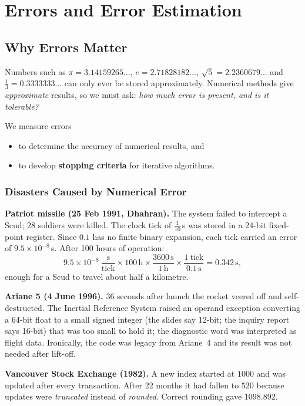\documentclass[hidelinks]{article}
\begin{document}
\section{Errors and Error Estimation}

\subsection{Why Errors Matter}

Numbers such as $\pi=3.14159265\ldots$, $e=2.71828182\ldots$, $\sqrt5=2.2360679\ldots$ and $\tfrac13=0.3333333\ldots$ can only ever be stored approximately. Numerical methods give \emph{approximate} results, so we must ask: \emph{how much error is present, and is it tolerable?}

We measure errors
\begin{itemize}
    \item to determine the accuracy of numerical results, and
    \item to develop \textbf{stopping criteria} for iterative algorithms.
\end{itemize}

\subsubsection{Disasters Caused by Numerical Error}

\textbf{Patriot missile (25 Feb 1991, Dhahran).} The system failed to intercept a Scud; 28 soldiers were killed. The clock tick of $\tfrac1{10}$\,s was stored in a 24-bit fixed-point register. Since $0.1$ has no finite binary expansion, each tick carried an error of $9.5\times10^{-8}$\,s. After 100 hours of operation:
\[
9.5\times10^{-8}\ \frac{\text{s}}{\text{tick}}\times 100\,\text{h}\times\frac{3600\,\text{s}}{1\,\text{h}}\times\frac{1\ \text{tick}}{0.1\,\text{s}}=0.342\,\text{s},
\]
enough for a Scud to travel about half a kilometre.

\textbf{Ariane 5 (4 June 1996).} 36 seconds after launch the rocket veered off and self-destructed. The Inertial Reference System raised an operand exception converting a 64-bit float to a small signed integer (the slides say 12-bit; the inquiry report says 16-bit) that was too small to hold it; the diagnostic word was interpreted as flight data. Ironically, the code was legacy from Ariane~4 and its result was not needed after lift-off.

\textbf{Vancouver Stock Exchange (1982).} A new index started at $1000$ and was updated after every transaction. After 22 months it had fallen to $520$ because updates were \emph{truncated} instead of \emph{rounded}. Correct rounding gave $1098.892$.
\end{document}
